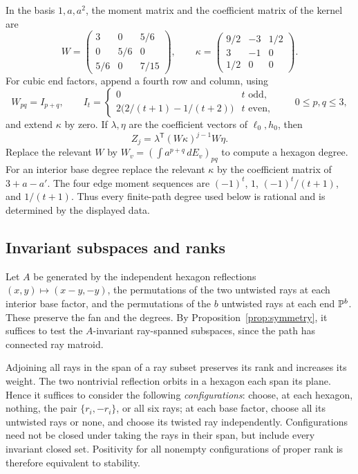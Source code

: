 In the basis $1,a,a^2$, the moment matrix and the coefficient matrix of the
kernel are
\begin{equation}\label{path:matrices}
 W=\begin{pmatrix}3&0&5/6\\0&5/6&0\\5/6&0&7/15\end{pmatrix},\qquad
 \kappa=\begin{pmatrix}9/2&-3&1/2\\3&-1&0\\1/2&0&0\end{pmatrix}.
\end{equation}
For cubic end factors, append a fourth row and column, using
\[
 W_{pq}=I_{p+q},\qquad
 I_t=\begin{cases}0&t\text{ odd},\\
 2\bigl(2/(t+1)-1/(t+2)\bigr)&t\text{ even},\end{cases}
 \qquad 0\le p,q\le3,
\]
and extend $\kappa$ by zero. If $\lambda,\eta$ are the coefficient vectors of
$\ell_0,h_0$, then
\begin{equation}\label{path:matrixvolume}
 Z_j=\lambda^{\mathsf T}(W\kappa)^{j-1}W\eta.
\end{equation}
Replace the relevant $W$ by $W_v=(\int a^{p+q}\,dE_v)_{pq}$ to compute a hexagon
degree. For an interior base degree replace the relevant $\kappa$ by the
coefficient matrix of $3+a-a'$. The four edge moment sequences are
$(-1)^t$, $1$, $(-1)^t/(t+1)$, and $1/(t+1)$. Thus every finite-path degree
used below is rational and is determined by the displayed data.

\subsection{Invariant subspaces and ranks}
Let $A$ be generated by the independent hexagon reflections
$(x,y)\mapsto(x-y,-y)$, the permutations of the two untwisted rays at each
interior base factor, and the permutations of the $b$ untwisted rays at each
end $\mathbb{P}^b$. These preserve the fan and the degrees. By
Proposition~\ref{prop:symmetry}, it suffices to test the $A$-invariant
ray-spanned subspaces, since the path has connected ray matroid.

Adjoining all rays in the span of a ray subset preserves its rank and increases
its weight. The two nontrivial reflection orbits in a hexagon each span its
plane. Hence it suffices to consider the following \emph{configurations}:
choose, at each hexagon, nothing, the pair $\{r_i,-r_i\}$, or all six rays;
at each base factor, choose all its untwisted rays or none, and choose its
twisted ray independently. Configurations need not be closed under taking
the rays in their span, but include every invariant closed set. Positivity
for all nonempty configurations of proper rank is therefore equivalent to stability.

